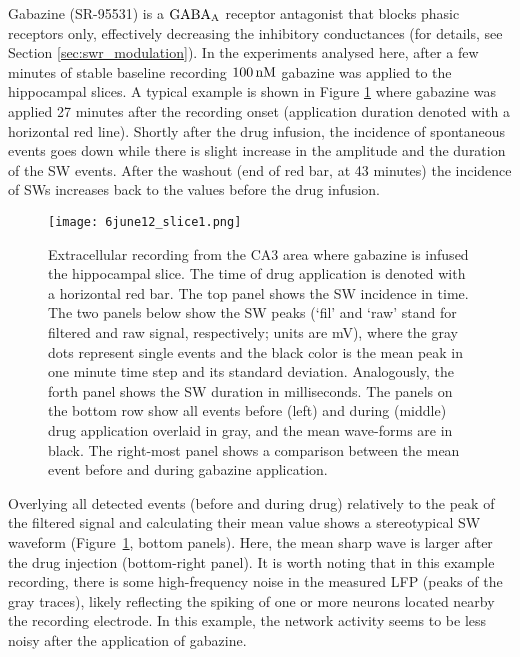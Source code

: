     Gabazine (SR-95531) is a $\rm GABA_A$ receptor antagonist that blocks
    phasic receptors only, effectively decreasing the inhibitory conductances
    (for details, see Section \ref{sec:swr_modulation}). In the experiments
    analysed here, after a few minutes of stable baseline recording $100 \,\rm
    nM$ gabazine was applied to the hippocampal slices. A typical example is
    shown in Figure \ref{fig:gabazine_ex} where gabazine was applied 27 minutes
    after the recording onset (application duration denoted with a horizontal
    red line). Shortly after the drug infusion, the incidence of spontaneous
    events goes down while there is slight increase in the amplitude and the
    duration of the SW events. After the washout (end of red bar, at 43
    minutes) the incidence of SWs increases back to the values before the drug
    infusion.
    
    \begin{figure}
      \texttt{[image: 6june12\_slice1.png]}
      \caption{
        Extracellular recording from the CA3 area where gabazine is infused the
        hippocampal slice. The time of drug application is denoted with a
        horizontal red bar. The top panel shows the SW incidence in time. The
        two panels below show the SW peaks (`fil' and `raw' stand for filtered
        and raw signal, respectively; units are mV), where the gray dots
        represent single events and the black color is the mean peak in one
        minute time step and its standard deviation. Analogously, the forth
        panel shows the SW duration in milliseconds. The panels on the bottom
        row show all events before (left) and during (middle) drug application
        overlaid in gray, and the mean wave-forms are in black. The right-most
        panel shows a comparison between the mean event before and during
        gabazine application.
      }
    \label{fig:gabazine_ex}
    \end{figure}

    Overlying all detected events (before and during drug) relatively to the
    peak of the filtered signal and calculating their mean value shows a
    stereotypical SW waveform (Figure~\ref{fig:gabazine_ex}, bottom panels).
    Here, the mean sharp wave is larger after the drug injection (bottom-right
    panel). It is worth noting that in this example recording, there is some
    high-frequency noise in the measured LFP (peaks of the gray traces), likely
    reflecting the spiking of one or more neurons located nearby the recording
    electrode. In this example, the network activity seems to be less noisy
    after the application of gabazine.

